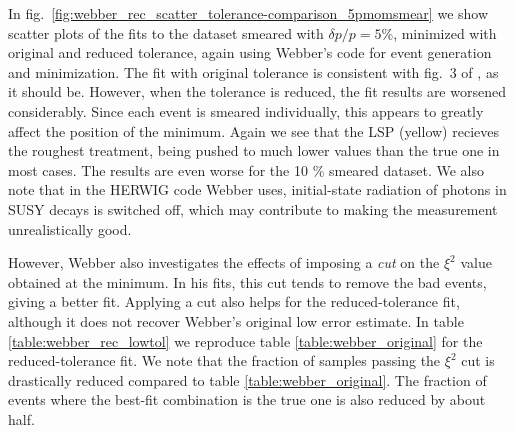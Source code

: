 \documentclass[twoside,english]{uiofysmaster}
\begin{document}
In fig.\ \ref{fig:webber_rec_scatter_tolerance-comparison_5pmomsmear} we show scatter plots of the fits to the dataset smeared with $\delta p/p = 5 \%$, minimized with original and reduced tolerance, again using Webber's code for event generation and minimization. The fit with original tolerance is consistent with fig.\ 3 of \cite{Webber:2009vm}, as it should be. However, when the tolerance is reduced, the fit results are worsened considerably. Since each event is smeared individually, this appears to greatly affect the position of the minimum. Again we see that the LSP (yellow) recieves the roughest treatment, being pushed to much lower values than the true one in most cases. The results are even worse for the 10 \% smeared dataset. We also note that in the HERWIG code Webber uses, initial-state radiation of photons in SUSY decays is switched off, which may contribute to making the measurement unrealistically good.






However, Webber also investigates the effects of imposing a {\it cut} on the $\xi^2$ value obtained at the minimum. In his fits, this cut tends to remove the bad events, giving a better fit. Applying a cut also helps for the reduced-tolerance fit, although it does not recover Webber's original low error estimate. In table \ref{table:webber_rec_lowtol} we reproduce table \ref{table:webber_original} for the reduced-tolerance fit. We note that the fraction of samples passing the $\xi^2$ cut is drastically reduced compared to table \ref{table:webber_original}. The fraction of events where the best-fit combination is the true one is also reduced by about half. 
\end{document}
